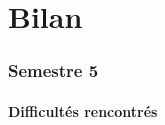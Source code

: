 \documentclass{article}
\begin{document}

\newpage
\part{Bilan}

\section{Semestre 5}

\subsection{Difficultés rencontrés}
\end{document}
